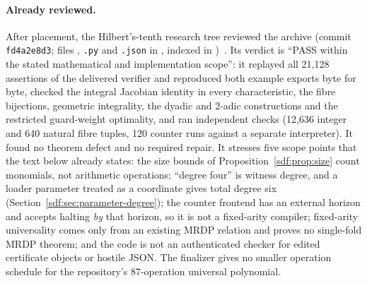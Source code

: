 \documentclass[11pt,a4paper]{article}
\theoremstyle{definition}
\theoremstyle{remark}
\begin{document}
\paragraph{Already reviewed.} After placement, the Hilbert's-tenth research
tree reviewed the archive (commit \texttt{fd4a2e8d3}; files
, \texttt{.py} and \texttt{.json}
in ,
indexed in )~\cite{review13}.
Its verdict is ``PASS within the stated mathematical and implementation
scope'': it replayed all 21,128 assertions of the delivered verifier and
reproduced both example exports byte for byte, checked the integral Jacobian
identity in every characteristic, the fibre bijections, geometric
integrality, the dyadic and $2$-adic constructions and the restricted
guard-weight optimality, and ran independent checks (12,636 integer and 640
natural fibre tuples, 120 counter runs against a separate interpreter). It
found no theorem defect and no required repair. It stresses five scope
points that the text below already states: the size bounds of
Proposition~\ref{sdf:prop:size} count monomials, not arithmetic operations;
``degree four'' is witness degree, and a loader parameter treated as a
coordinate gives total degree six (Section~\ref{sdf:sec:parameter-degree});
the counter frontend has an external horizon and accepts halting \emph{by}
that horizon, so it is not a fixed-arity compiler; fixed-arity universality
comes only from an existing MRDP relation and proves no single-fold MRDP
theorem; and the code is not an authenticated checker for edited certificate
objects or hostile JSON. The finalizer gives no smaller operation schedule
for the repository's 87-operation universal polynomial.
\end{document}
